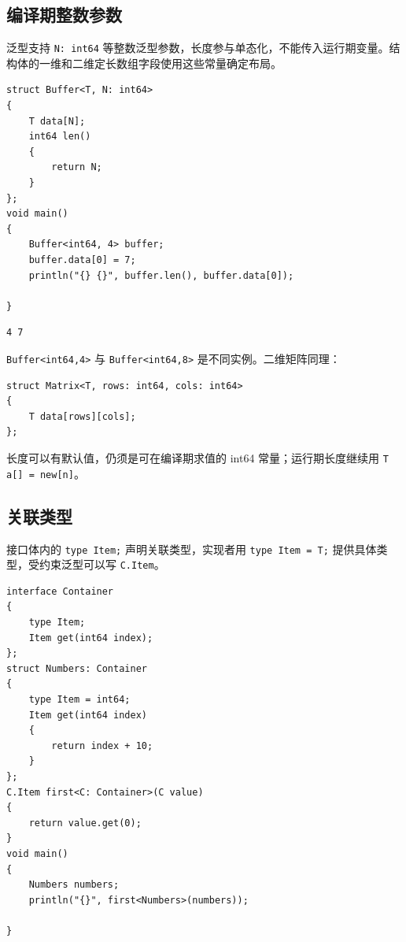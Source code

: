 \subsection*{编译期整数参数}

泛型支持 \texttt{N:\allowbreak{} int64} 等整数泛型参数，长度参与单态化，不能传入运行期变量。结构体的一维和二维定长数组字段使用这些常量确定布局。

\par
\medskip
\begin{lstlisting}[style=chali]
struct Buffer<T, N: int64>
{
    T data[N];
    int64 len()
    {
        return N;
    }
};
void main()
{
    Buffer<int64, 4> buffer;
    buffer.data[0] = 7;
    println("{} {}", buffer.len(), buffer.data[0]);

}
\end{lstlisting}
\par
\medskip

\par
\medskip
\begin{lstlisting}[style=out]
4 7
\end{lstlisting}
\par
\medskip

\texttt{Buffer<\allowbreak{}int64,\allowbreak{}4>\allowbreak{}} 与 \texttt{Buffer<\allowbreak{}int64,\allowbreak{}8>\allowbreak{}} 是不同实例。二维矩阵同理：

\par
\medskip
\begin{lstlisting}[style=chali]
struct Matrix<T, rows: int64, cols: int64>
{
    T data[rows][cols];
};
\end{lstlisting}
\par
\medskip

长度可以有默认值，仍须是可在编译期求值的 int64 常量；运行期长度继续用 \texttt{T a[\allowbreak{}]\allowbreak{} =\allowbreak{} new[\allowbreak{}n]\allowbreak{}}。

\subsection*{关联类型}

接口体内的 \texttt{type Item;} 声明关联类型，实现者用 \texttt{type Item =\allowbreak{} T;} 提供具体类型，受约束泛型可以写 \texttt{C.\allowbreak{}Item}。

\par
\medskip
\begin{lstlisting}[style=chali]
interface Container
{
    type Item;
    Item get(int64 index);
};
struct Numbers: Container
{
    type Item = int64;
    Item get(int64 index)
    {
        return index + 10;
    }
};
C.Item first<C: Container>(C value)
{
    return value.get(0);
}
void main()
{
    Numbers numbers;
    println("{}", first<Numbers>(numbers));

}
\end{lstlisting}
\par
\medskip

